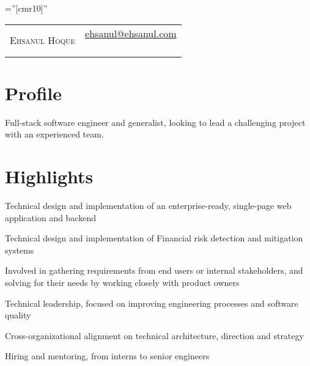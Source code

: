 \documentclass[a4paper,10pt]{article}
\newenvironment{packed-list}{
  \vspace{2pt}
  \begin{itemize}[itemsep=1pt,partopsep=0pt,leftmargin=1.5em]
    \setlength{\parskip}{0pt}
    \setlength{\partopsep}{9pt}
    \setlength{\parsep}{0pt}
    \setlength{\topsep}{0pt}
} {\end{itemize}}
\begin{document}
\pagestyle{empty} %

\font\fb=''[cmr10]'' %

\begin{tabular*}{\textwidth}{@{\extracolsep{\fill}} lr}
      {\color{Gray!50!black}\Huge \textsc{Ehsanul Hoque}}
      & \pbox{20cm}{
          {\large \href{mailto:ehsanul@ehsanul.com}{ehsanul@ehsanul.com}}\\
          \hspace*{\fill}{\large (415) 494-1172}\\
        }\\
\end{tabular*}

\section{Profile}
{\fontsize{12}{14}\selectfont  
  Full-stack software engineer and generalist, looking to lead a challenging
  project with an experienced team.}


\section{Highlights}
  \begin{packed-list}
    \item{ Technical design and implementation of an enterprise-ready, single-page web application and backend }
    \item{ Technical design and implementation of Financial risk detection and mitigation systems }
    \item{ Involved in gathering requirements from end users or internal stakeholders, and solving for their needs by working closely with product owners }
    \item{ Technical leadership, focused on improving engineering processes and software quality }
    \item{ Cross-organizational alignment on technical architecture, direction and strategy }
    \item{ Hiring and mentoring, from interns to senior engineers }
  \end{packed-list}
\end{document}
